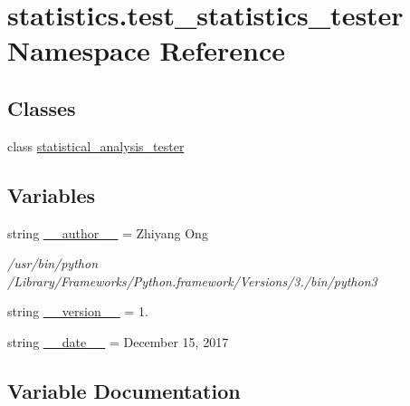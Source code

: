 \hypertarget{namespacestatistics_1_1test__statistics__tester}{}\section{statistics.\+test\+\_\+statistics\+\_\+tester Namespace Reference}
\label{namespacestatistics_1_1test__statistics__tester}
\subsection*{Classes}
\begin{DoxyCompactItemize}
\item 
class \hyperlink{classstatistics_1_1test__statistics__tester_1_1statistical__analysis__tester}{statistical\+\_\+analysis\+\_\+tester}
\end{DoxyCompactItemize}
\subsection*{Variables}
\begin{DoxyCompactItemize}
\item 
string \hyperlink{namespacestatistics_1_1test__statistics__tester_ab9ecb1d5ecfb751c8b2a27ac138a0eed}{\+\_\+\+\_\+author\+\_\+\+\_\+} = \textquotesingle{}Zhiyang Ong\textquotesingle{}
\begin{DoxyCompactList}\small\item\em /usr/bin/python /\+Library/\+Frameworks/\+Python.framework/\+Versions/3./bin/python3 \end{DoxyCompactList}\item 
string \hyperlink{namespacestatistics_1_1test__statistics__tester_a29677162e8392e196da563156d924f5d}{\+\_\+\+\_\+version\+\_\+\+\_\+} = \textquotesingle{}1.\textquotesingle{}
\item 
string \hyperlink{namespacestatistics_1_1test__statistics__tester_a0d2103581aebe4f7dfb05775432fa386}{\+\_\+\+\_\+date\+\_\+\+\_\+} = \textquotesingle{}December 15, 2017\textquotesingle{}
\end{DoxyCompactItemize}


\subsection{Variable Documentation}
\hypertarget{namespacestatistics_1_1test__statistics__tester_ab9ecb1d5ecfb751c8b2a27ac138a0eed}{}
